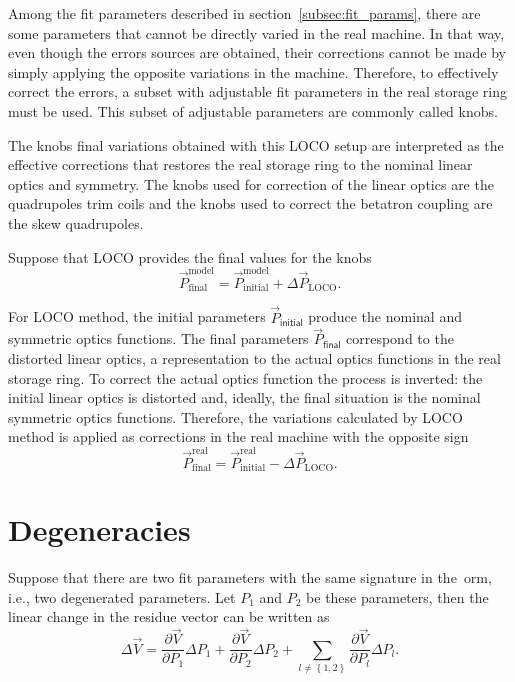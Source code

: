 Among the fit parameters described in section~\ref{subsec:fit_params}, there are some parameters that cannot be directly varied in the real machine. In that way, even though the errors sources are obtained, their corrections cannot be made by simply applying the opposite variations in the machine. Therefore, to effectively correct the errors, a subset with adjustable fit parameters in the real storage ring must be used. This subset of adjustable parameters are commonly called knobs.

The knobs final variations obtained with this LOCO setup are interpreted as the effective corrections that restores the real storage ring to the nominal linear optics and symmetry. The knobs used for correction of the linear optics are the quadrupoles trim coils and the knobs used to correct the betatron coupling are the skew quadrupoles. 

Suppose that LOCO provides the final values for the knobs
\begin{equation}
    \vec{P}_{\mathrm{final}}^{\mathrm{model}} = \vec{P}_{\mathrm{initial}}^{\mathrm{model}} + \Delta\vec{P}_{\mathrm{LOCO}}.
\end{equation}

For LOCO method, the initial parameters $\vec{P}_{\mathsf{initial}}$ produce the nominal and symmetric optics functions. The final parameters $\vec{P}_{\mathsf{final}}$ correspond to the distorted linear optics, a representation to the actual optics functions in the real storage ring. To correct the actual optics function the process is inverted: the initial linear optics is distorted and, ideally, the final situation is the nominal symmetric optics functions. Therefore, the variations calculated by LOCO method is applied as corrections in the real machine with the opposite sign
\begin{equation}
    \vec{P}_{\mathrm{final}}^{\mathrm{real}} = \vec{P}_{\mathrm{initial}}^{\mathrm{real}} - \Delta\vec{P}_{\mathrm{LOCO}}.
\end{equation}
\section{Degeneracies}\label{sec:degeneracy}
Suppose that there are two fit parameters with the same signature in the~\gls{orm}, i.e., two degenerated parameters. Let $P_1$ and $P_2$ be these parameters, then the linear change in the residue vector can be written as
\begin{equation}
\Delta \vec{V} = \dfrac{\partial \vec{V}}{\partial P_{1}} \Delta P_{1} + \dfrac{\partial \vec{V}}{\partial P_{2}} \Delta P_{2} + \sum_{l \neq \left\{1,2\right\}}\dfrac{\partial \vec{V}}{\partial P_{l}} \Delta P_{l}.
\end{equation}

